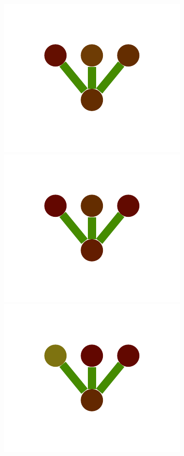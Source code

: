 \documentclass[a4paper,10pt]{article}
\begin{document}
\begin{figure}
{    \includegraphics[scale=.2]{../figures/vector/6-1-single-color-flower-data-3.pdf}
    \includegraphics[scale=.2]{../figures/vector/6-1-single-color-flower-data-4.pdf}
    \includegraphics[scale=.2]{../figures/vector/6-1-single-color-flower-data-5.pdf}
}
\end{figure}
\end{document}
